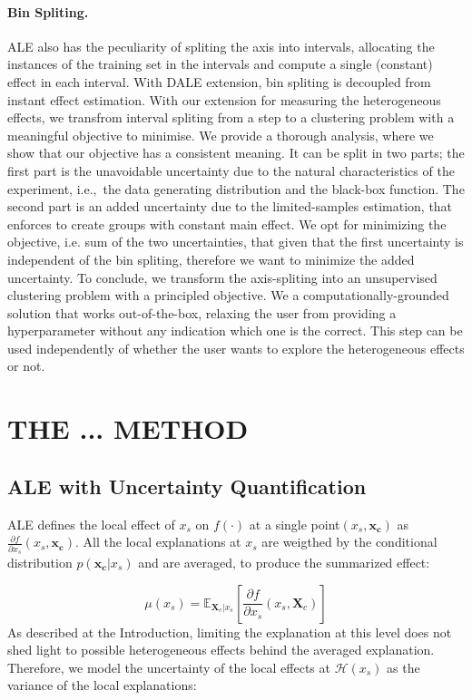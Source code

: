 \documentclass[twoside]{article}
\newcommand{\dfdx}{\frac{\partial f}{\partial x_s}}
\newcommand{\xc}{\mathbf{x_c}}
\newcommand{\Xcb}{\mathbf{X}_c}
\begin{document}
\paragraph{Bin Spliting.} ALE also has the peculiarity of spliting the
axis into intervals, allocating the instances of the training set in
the intervals and compute a single (constant) effect in each
interval. With DALE extension, bin spliting is decoupled from instant
effect estimation. With our extension for measuring the heterogeneous
effects, we transfrom interval spliting from a step to a clustering
problem with a meaningful objective to minimise. We provide a thorough
analysis, where we show that our objective has a consistent
meaning. It can be split in two parts; the first part is the
unavoidable uncertainty due to the natural characteristics of the
experiment, i.e.,~the data generating distribution and the black-box
function. The second part is an added uncertainty due to the
limited-samples estimation, that enforces to create groups with
constant main effect. We opt for minimizing the objective, i.e. sum of
the two uncertainties, that given that the first uncertainty is
independent of the bin spliting, therefore we want to minimize the
added uncertainty. To conclude, we transform the axis-spliting into an
unsupervised clustering problem with a principled objective. We a
computationally-grounded solution that works out-of-the-box, relaxing
the user from providing a hyperparameter without any indication which
one is the correct. This step can be used independently of whether the
user wants to explore the heterogeneous effects or not.

\section{THE ... METHOD}

\subsection{ALE with Uncertainty Quantification}

ALE defines the local effect of \(x_s\) on \(f(\cdot)\) at a single
point\((x_s, \xc)\) as \(\dfdx (x_s, \xc)\). All the local
explanations at \(x_s\) are weigthed by the conditional distribution
\(p(\xc|x_s)\) and are averaged, to produce the summarized effect:

\begin{equation}
  \label{eq:ALE_mean}
  \mu(x_s) = \mathbb{E}_{\Xcb|x_s}\left [\dfdx (x_s, \Xcb)\right ]
\end{equation}
\noindent
As described at the Introduction, limiting the explanation at this
level does not shed light to possible heterogeneous effects behind the
averaged explanation. Therefore, we model the uncertainty of the local
effects at \(\mathcal{H}(x_s)\) as the variance of the local
explanations:
\end{document}
